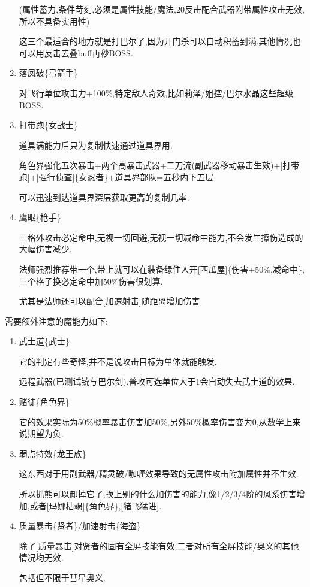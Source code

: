 \begin{enumerate}
		(属性蓄力,条件苛刻,必须是属性技能/魔法,20反击配合武器附带属性攻击无效,所以不具备实用性)

		这三个最适合的地方就是打巴尔了,因为开门杀可以自动积蓄到满.其他情况也可以用反击去叠buff再秒BOSS.

		\item
		落凤破\{弓箭手\}

		对飞行单位攻击力+100\%,特定敌人奇效,比如莉泽/姐控/巴尔水晶这些超级BOSS.

		\item
		打带跑\{女战士\}

		道具满能力后只为复制快速通过道具界用.

		角色界强化五次暴击+两个高暴击武器+二刀流(副武器移动暴击生效)+[打带跑]+[强行侦查]\{女忍者\}+道具界部队=五秒内下五层

		可以迅速到达道具界深层获取更高的复制几率.

		\item
		鹰眼\{枪手\}

		三格外攻击必定命中,无视一切回避,无视一切减命中能力,不会发生擦伤造成的大幅伤害减少.

		法师强烈推荐带一个,带上就可以在装备绿住人开[西瓜屋]\{伤害+50\%,减命中\},三个格子换必定命中加50\%伤害很划算.

		尤其是法师还可以配合[加速射击]随距离增加伤害.


	\end{enumerate}

	\newpage

	需要额外注意的魔能力如下:

	\begin{enumerate}

		\item
		武士道\{武士\}

		它的判定有些奇怪,并不是说攻击目标为单体就能触发.

		远程武器(已测试铳与巴尔剑),普攻可选单位大于1会自动失去武士道的效果.

		\item
		赌徒\{角色界\}

		它的效果实际为50\%概率暴击伤害加50\%,另外50\%概率伤害变为0,从数学上来说期望为负.

		\item
		弱点特效\{龙王族\}

		这东西对于用副武器/精灵破/咖喱效果导致的无属性攻击附加属性并不生效.

		所以抓熊可以卸掉它了,换上别的什么加伤害的能力,像1/2/3/4阶的风系伤害增加,或者[玛娜枯竭]\{角色界\},[猪飞猛进].

		\item
		质量暴击\{贤者\}/加速射击\{海盗\}

		除了[质量暴击]对贤者的固有全屏技能有效,二者对所有全屏技能/奥义的其他情况均无效.

		包括但不限于彗星奥义.

	\end{enumerate}
	
